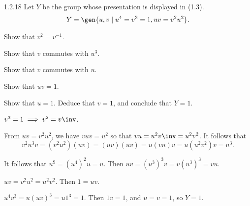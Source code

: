 \begin{exercise}{1.2.18}
    Let $Y$ be the group whose presentation is displayed in (1.3).
    \[
    	Y = \gen{u, v \mid u^4 = v^3 = 1, uv = v^2u^2}.
    \]
    \begin{subexercises}
        \item Show that $v^2 = v^{-1}$.
        
        \item Show that $v$ commutes with $u^3$.
        
        \item Show that $v$ commutes with $u$.
        
        \item Show that $uv = 1$.
        
        \item Show that $u = 1$.
	    Deduce that $v = 1$, and conclude that $Y = 1$.
        
    \end{subexercises}
\end{exercise}

\begin{solenum}
    \item $v^3 = 1 \implies v^2 = v\inv$.
    \item From $uv = v^2u^2$, we have $vuv = u^2$ so that $vu = u^2v\inv = u^2v^2$.
	It follows that
    \[
    	v^2u^3v = (v^2u^2)(uv) = (uv)(uv) = u(vu)v = u(u^2v^2)v = u^3.
    \]
    \item It follows that $u^9 = (u^4)^2u = u$.
	Then $uv = (u^3)^3v = v(u^3)^3 = vu$.
    \item $uv = v^2u^2 = u^2v^2$.
	Then $1 = uv$.
    \item $u^4v^3 = u(uv)^3 = u1^3 = 1$.
	Then $1v = 1$, and $u = v = 1$, so $Y = 1$.
\end{solenum}